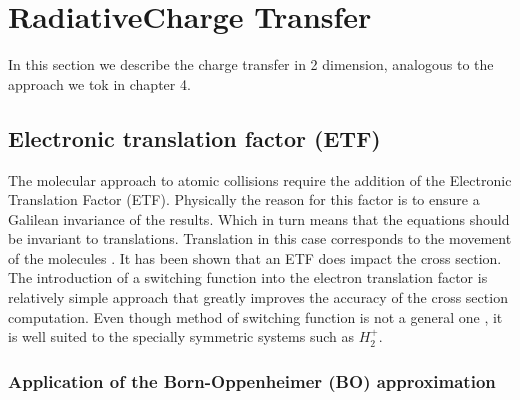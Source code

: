 \chapter{RadiativeCharge Transfer}

In this section we describe the charge transfer in 2 dimension, analogous to the approach we tok in chapter 4.

\section{Electronic translation factor (ETF) \cite{ETF1}\cite{ETF2}\cite{ETF3}}

The molecular approach to atomic collisions require the addition of the Electronic Translation Factor (ETF). Physically the reason for this factor is to ensure a Galilean invariance of the results. Which in turn means that the equations should be invariant to translations. Translation in this case corresponds to the movement of the molecules \cite{ETF2}. It has been shown \cite{ETF2} that an ETF does impact the cross section. 
The introduction of a switching function into the electron translation factor is relatively simple approach that greatly improves the accuracy of the cross section computation. Even though method of switching function is not a general one \cite{ETF3}, it is well suited to the specially symmetric systems such as $ H_{2}^{+} $.

\subsection{Application of the Born-Oppenheimer (BO) approximation}

